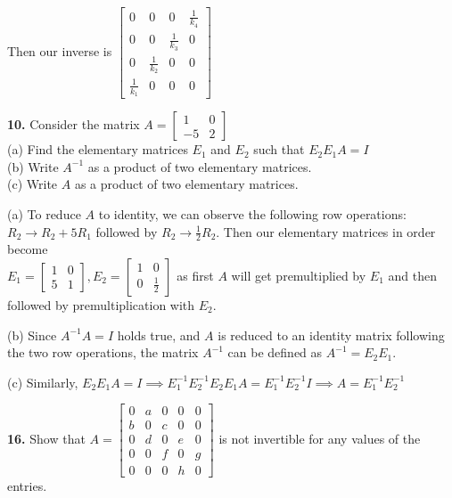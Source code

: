 \documentclass[addpoints]{exam}
\begin{document}
\begin{questions}
\begin{solution}
    Then our inverse is $ \begin{bmatrix}
        0 & 0 & 0 & \frac{1}{k_4} \\ 
        0 & 0 & \frac{1}{k_3} & 0 \\
        0 & \frac{1}{k_2} & 0 & 0 \\
        \frac{1}{k_1} & 0 & 0 & 0
    \end{bmatrix} $
    \end{solution}

    \textbf{10.} Consider the matrix $ A = \begin{bmatrix}
        1 & 0 \\ -5 & 2
    \end{bmatrix} $ \\ 
    (a) Find the elementary matrices $ E_1 $ and $ E_2 $ such that $ E_2E_1A = I $ \\ 
    (b) Write $ A^{-1} $ as a product of two elementary matrices. \\ 
    (c) Write $A$ as a product of two elementary matrices.
    \begin{solution}
        
        (a) To reduce $A$ to identity, we can observe the following row operations: $ R_2 \rightarrow R_2 + 5 R_1 $ followed by $ R_2 \rightarrow \frac{1}{2}R_2 $. Then our elementary matrices in order become \\ 
        $ E_1 = \begin{bmatrix}
            1 & 0 \\ 5 & 1
        \end{bmatrix}, E_2 = \begin{bmatrix}
            1 & 0 \\ 0 & \frac{1}{2}
        \end{bmatrix} $ as first $A$ will get premultiplied by $ E_1 $ and then followed by premultiplication with $E_2$.

        (b) Since $ A^{-1}A = I $ holds true, and $A$ is reduced to an identity matrix following the two row operations, the matrix $ A^{-1} $ can be defined as $ A^{-1} = E_2E_1 $.

        (c) Similarly, $ E_2E_1A = I \implies E_1^{-1}E_2^{-1}E_2E_1A = E_1^{-1}E_2^{-1}I \implies A = E_1^{-1}E_2^{-1}$   
    \end{solution}

    \textbf{16. } Show that $ A = \begin{bmatrix}
        0 & a & 0 & 0 & 0 \\ b & 0 & c & 0 & 0 \\ 0 & d & 0 & e & 0 \\ 0 & 0 & f & 0 & g \\ 0 & 0 & 0 & h & 0
    \end{bmatrix} $ is not invertible for any values of the entries. 
    

\end{questions}
\end{document}
